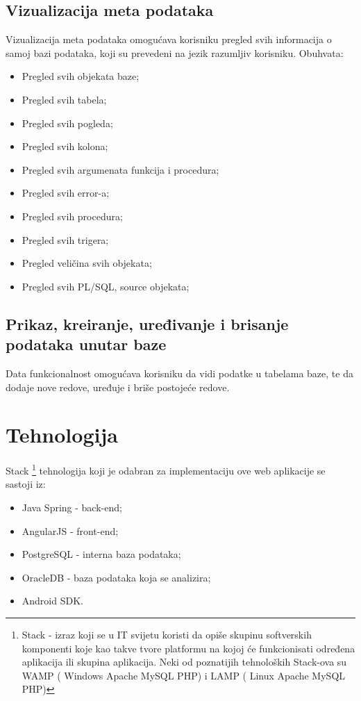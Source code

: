 \documentclass[12pt, a4paper]{report}
\theoremstyle{definition}
\begin{document}
\section{Vizualizacija meta podataka}
Vizualizacija meta podataka omogućava korisniku pregled svih informacija o samoj bazi podataka, koji su prevedeni na jezik razumljiv korisniku.
Obuhvata:
\begin{itemize}
\item 	Pregled svih objekata baze;

\item Pregled svih tabela;

\item Pregled svih pogleda;

\item Pregled svih kolona;

\item Pregled svih argumenata funkcija i procedura;

\item Pregled svih error-a;

\item Pregled svih procedura;

\item Pregled svih trigera;

\item Pregled veličina svih objekata;

\item Pregled svih PL/SQL, source objekata;
\end{itemize}
\section{Prikaz, kreiranje, uređivanje i brisanje podataka unutar baze}
Data funkcionalnost omogućava korisniku da vidi podatke u tabelama baze, te da dodaje nove redove, uređuje i briše postojeće redove.

\chapter{Tehnologija}

Stack \footnote{Stack - izraz koji se u IT svijetu koristi da opiše skupinu softverskih komponenti koje kao takve tvore platformu na kojoj će funkcionisati određena aplikacija ili skupina aplikacija. Neki od poznatijih tehnoloških Stack-ova su WAMP ( Windows Apache MySQL PHP) i LAMP ( Linux Apache MySQL PHP)}  tehnologija koji je odabran za implementaciju ove web aplikacije se sastoji iz:
\begin{itemize}
	\item Java Spring - back-end;
	\item AngularJS - front-end;
	\item PostgreSQL - interna baza podataka;
	\item OracleDB - baza podataka koja se analizira;
	\item Android SDK.
\end{itemize}
\end{document}
